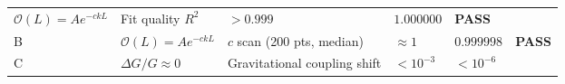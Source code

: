 \documentclass[
  11pt,
]{article}
\begin{document}
\begin{longtable}[]{@{}llllll@{}}
\begin{minipage}[t]{0.14\columnwidth}
\(\mathcal{O}(L) = Ae^{-ckL}\)\strut
\end{minipage} & \begin{minipage}[t]{0.14\columnwidth}\raggedright
Fit quality \(R^2\)\strut
\end{minipage} & \begin{minipage}[t]{0.14\columnwidth}\raggedright
\(> 0.999\)\strut
\end{minipage} & \begin{minipage}[t]{0.14\columnwidth}\raggedright
\(1.000000\)\strut
\end{minipage} & \begin{minipage}[t]{0.14\columnwidth}\raggedright
\textbf{PASS}\strut
\end{minipage}\tabularnewline
\begin{minipage}[t]{0.14\columnwidth}\raggedright
B\strut
\end{minipage} & \begin{minipage}[t]{0.14\columnwidth}\raggedright
\(\mathcal{O}(L) = Ae^{-ckL}\)\strut
\end{minipage} & \begin{minipage}[t]{0.14\columnwidth}\raggedright
\(c\) scan (200 pts, median)\strut
\end{minipage} & \begin{minipage}[t]{0.14\columnwidth}\raggedright
\(\approx 1\)\strut
\end{minipage} & \begin{minipage}[t]{0.14\columnwidth}\raggedright
\(0.999998\)\strut
\end{minipage} & \begin{minipage}[t]{0.14\columnwidth}\raggedright
\textbf{PASS}\strut
\end{minipage}\tabularnewline
\begin{minipage}[t]{0.14\columnwidth}\raggedright
C\strut
\end{minipage} & \begin{minipage}[t]{0.14\columnwidth}\raggedright
\(\Delta G / G \approx 0\)\strut
\end{minipage} & \begin{minipage}[t]{0.14\columnwidth}\raggedright
Gravitational coupling shift\strut
\end{minipage} & \begin{minipage}[t]{0.14\columnwidth}\raggedright
\(< 10^{-3}\)\strut
\end{minipage} & \begin{minipage}[t]{0.14\columnwidth}\raggedright
\(< 10^{-6}\)\strut

\end{minipage}
\end{longtable}
\end{document}
